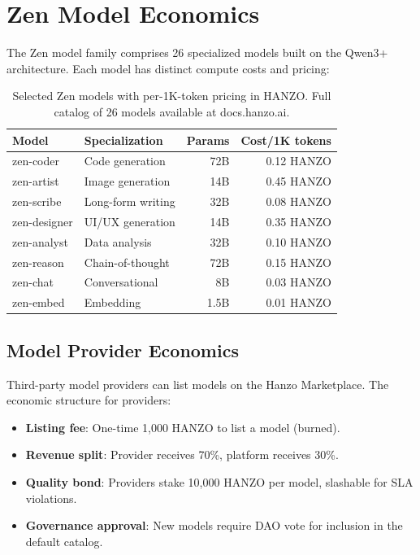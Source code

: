 \section{Zen Model Economics}

\label{sec:zen}

The Zen model family comprises 26 specialized models built on the Qwen3+
architecture. Each model has distinct compute costs and pricing:

\begin{table}[H]
\centering
\small
\begin{tabular}{llrr}
\toprule
\textbf{Model} & \textbf{Specialization} & \textbf{Params} &
\textbf{Cost/1K tokens} \\
\midrule
zen-coder & Code generation & 72B & 0.12 HANZO \\
zen-artist & Image generation & 14B & 0.45 HANZO \\
zen-scribe & Long-form writing & 32B & 0.08 HANZO \\
zen-designer & UI/UX generation & 14B & 0.35 HANZO \\
zen-analyst & Data analysis & 32B & 0.10 HANZO \\
zen-reason & Chain-of-thought & 72B & 0.15 HANZO \\
zen-chat & Conversational & 8B & 0.03 HANZO \\
zen-embed & Embedding & 1.5B & 0.01 HANZO \\
\bottomrule
\end{tabular}
\caption{Selected Zen models with per-1K-token pricing in HANZO. Full catalog of 26 models available at docs.hanzo.ai.}
\label{tab:zen}
\end{table}

\subsection{Model Provider Economics}

Third-party model providers can list models on the Hanzo Marketplace. The
economic structure for providers:

\begin{itemize}[leftmargin=1.1em]
    \item \textbf{Listing fee}: One-time 1,000 HANZO to list a model (burned).
    \item \textbf{Revenue split}: Provider receives 70\%, platform receives 30\%.
    \item \textbf{Quality bond}: Providers stake 10,000 HANZO per model, slashable
    for SLA violations.
    \item \textbf{Governance approval}: New models require DAO vote for inclusion
    in the default catalog.
\end{itemize}

